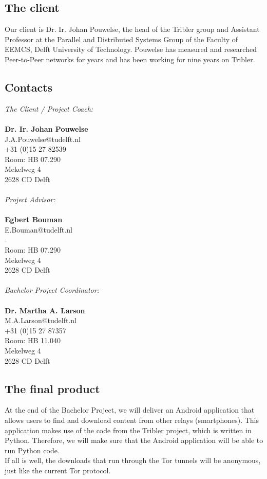 \subsection{The client}
Our client is Dr. Ir. Johan Pouwelse, the head of the Tribler group and Assistant Professor at the Parallel and Distributed Systems Group of the Faculty of EEMCS, Delft University of Technology. Pouwelse has measured and researched Peer-to-Peer networks for years and has been working for nine years on Tribler.

\subsection{Contacts}

\emph{The Client / Project Coach:}\\\\
\textbf{Dr. Ir. Johan Pouwelse}\\
J.A.Pouwelse@tudelft.nl\\
+31 (0)15 27 82539\\
Room: HB 07.290\\
Mekelweg 4\\
2628 CD Delft\\\\

\emph{Project Advisor:}\\\\
\textbf{Egbert Bouman}\\
E.Bouman@tudelft.nl\\ 
-\\
Room: HB 07.290\\
Mekelweg 4\\
2628 CD Delft\\\\

\emph{Bachelor Project Coordinator:}\\\\
\textbf{Dr. Martha A. Larson}\\
M.A.Larson@tudelft.nl\\
+31 (0)15 27 87357\\
Room: HB 11.040\\
Mekelweg 4\\
2628 CD Delft\\

\subsection{The final product}
\label{ssec:final-product}
At the end of the Bachelor Project, we will deliver an Android application that allows users to find and download content from other relays (smartphones). This application makes use of the code from the Tribler project, which is written in Python. Therefore, we will make sure that the Android application will be able to run Python code.\\
If all is well, the downloads that run through the Tor tunnels will be anonymous, just like the current Tor protocol.

